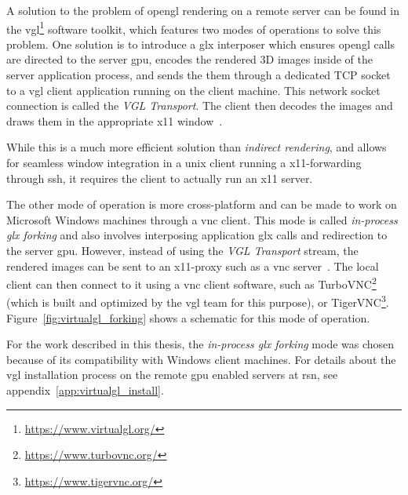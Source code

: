 A solution to the problem of \gls{opengl} rendering on a remote server can be found in the \gls{vgl}\footnote{\url{https://www.virtualgl.org/}} software toolkit, which features two modes of operations to solve this problem. One solution is to introduce a \gls{glx} interposer which ensures \gls{opengl} calls are directed to the server \gls{gpu}, encodes the rendered 3D images inside of the server application process, and sends the them through a dedicated TCP socket to a \gls{vgl} client application running on the client machine. This network socket connection is called the \textit{VGL Transport}. The client then decodes the images and draws them in the appropriate \gls{x11} window~\cite{virtualgl}.

While this is a much more efficient solution than \textit{indirect rendering}, and allows for seamless window integration in a \gls{unix} client running a \gls{x11}-forwarding through \gls{ssh}, it requires the client to actually run an \gls{x11} server.

The other mode of operation is more cross-platform and can be made to work on Microsoft Windows machines through a \gls{vnc} client. This mode is called \textit{in-process \gls{glx} forking} and also involves interposing application \gls{glx} calls and redirection to the server \gls{gpu}. However, instead of using the \textit{VGL Transport} stream, the rendered images can be sent to an \gls{x11}-proxy such as a \gls{vnc} server~\cite{virtualgl}. The local client can then connect to it using a \gls{vnc} client software, such as TurboVNC\footnote{\url{https://www.turbovnc.org/}} (which is built and optimized by the \gls{vgl} team for this purpose), or TigerVNC\footnote{\url{https://www.tigervnc.org/}}. Figure~\ref{fig:virtualgl_forking} shows a schematic for this mode of operation.

For the work described in this thesis, the \textit{in-process \gls{glx} forking} mode was chosen because of its compatibility with Windows client machines. For details about the \gls{vgl} installation process on the remote \gls{gpu} enabled servers at \gls{rsn}, see appendix~\ref{app:virtualgl_install}.
